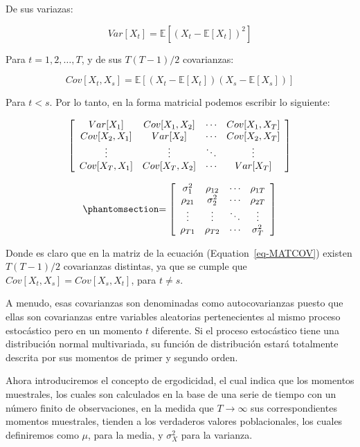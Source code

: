 \documentclass[
  a4paper,
]{article}
\begin{document}
De sus variazas:

\[
Var[X_t] = \mathbb{E}[(X_t - \mathbb{E}[X_t])^2]
\]

Para \(t = 1, 2, \ldots, T\), y de sus \(T(T-1)/2\) covarianzas:

\[
Cov[X_t,X_s] = \mathbb{E}[(X_t - \mathbb{E}[X_t])(X_s - \mathbb{E}[X_s])]
\]

Para \(t < s\). Por lo tanto, en la forma matricial podemos escribir lo
siguiente:

\[
\left[
    \begin{array}{c c c c}
    Var[X_1] & Cov[X_1,X_2] & \cdots & Cov[X_1,X_T] \\
    Cov[X_2,X_1] & Var[X_2] & \cdots & Cov[X_2,X_T] \\
    \vdots & \vdots & \ddots & \vdots \\
    Cov[X_T,X_1] & Cov[X_T,X_2] & \cdots & Var[X_T] \\
    \end{array}
\right]
\]

\begin{equation}\phantomsection\label{eq-MATCOV}{
= \left[
    \begin{array}{c c c c}
    \sigma_1^2 & \rho_{12} & \cdots & \rho_{1T} \\
    \rho_{21} & \sigma_2^2 & \cdots & \rho_{2T} \\
    \vdots & \vdots & \ddots & \vdots \\
    \rho_{T1} & \rho_{T2} & \cdots & \sigma_T^2 \\
    \end{array}
\right]
}\end{equation}

Donde es claro que en la matriz de la ecuación
(Equation~\ref{eq-MATCOV}) existen \(T(T-1)/2\) covarianzas distintas,
ya que se cumple que \(Cov[X_t,X_s] = Cov[X_s,X_t]\), para \(t \neq s\).

A menudo, esas covarianzas son denominadas como autocovarianzas puesto
que ellas son covarianzas entre variables aleatorias pertenecientes al
mismo proceso estocástico pero en un momento \(t\) diferente. Si el
proceso estocástico tiene una distribución normal multivariada, su
función de distribución estará totalmente descrita por sus momentos de
primer y segundo orden.

Ahora introduciremos el concepto de ergodicidad, el cual indica que los
momentos muestrales, los cuales son calculados en la base de una serie
de tiempo con un número finito de observaciones, en la medida que
\(T \rightarrow \infty\) sus correspondientes momentos muestrales,
tienden a los verdaderos valores poblacionales, los cuales definiremos
como \(\mu\), para la media, y \(\sigma^2_X\) para la varianza.
\end{document}
